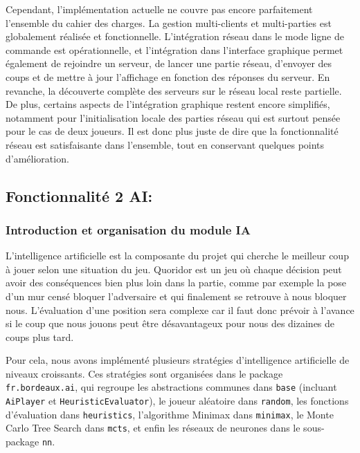 \documentclass[a4paper]{article}
\begin{document}
Cependant, l’implémentation actuelle ne couvre pas encore parfaitement l’ensemble du cahier des charges. La gestion multi-clients et multi-parties est globalement réalisée et fonctionnelle. L’intégration réseau dans le mode ligne de commande est opérationnelle, et l’intégration dans l’interface graphique permet également de rejoindre un serveur, de lancer une partie réseau, d’envoyer des coups et de mettre à jour l’affichage en fonction des réponses du serveur. En revanche, la découverte complète des serveurs sur le réseau local reste partielle. De plus, certains aspects de l’intégration graphique restent encore simplifiés, notamment pour l’initialisation locale des parties réseau qui est surtout pensée pour le cas de deux joueurs. Il est donc plus juste de dire que la fonctionnalité réseau est satisfaisante dans l’ensemble, tout en conservant quelques points d’amélioration.



\subsection{Fonctionnalité 2 AI: }

\subsubsection{Introduction et organisation du module IA}

L’intelligence artificielle est la composante du projet qui cherche le meilleur coup à jouer selon une situation du jeu. Quoridor est un jeu où chaque décision peut avoir des conséquences bien plus loin dans la partie, comme par exemple la pose d’un mur censé bloquer l’adversaire et qui finalement se retrouve à nous bloquer nous. L’évaluation d’une position sera complexe car il faut donc prévoir à l’avance si le coup que nous jouons peut être désavantageux pour nous des dizaines de coups plus tard.

Pour cela, nous avons implémenté plusieurs stratégies d’intelligence artificielle de niveaux croissants. Ces stratégies sont organisées dans le package \texttt{fr.bordeaux.ai}, qui regroupe les abstractions communes dans \texttt{base} (incluant \texttt{AiPlayer} et \texttt{HeuristicEvaluator}), le joueur aléatoire dans \texttt{random}, les fonctions d’évaluation dans \texttt{heuristics}, l’algorithme Minimax dans \texttt{minimax}, le Monte Carlo Tree Search dans \texttt{mcts}, et enfin les réseaux de neurones dans le sous-package \texttt{nn}.
\end{document}
